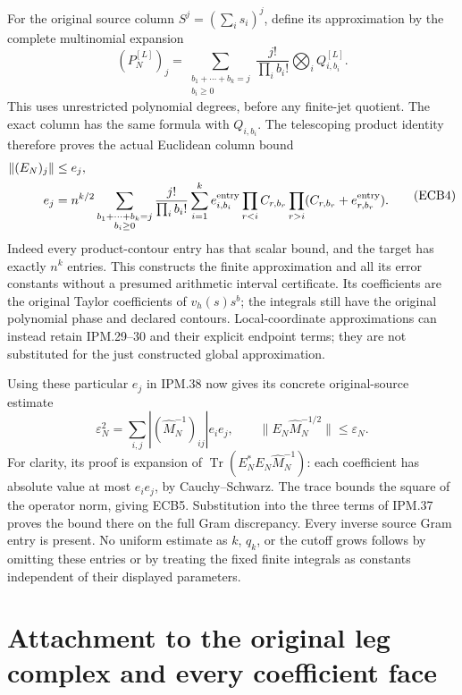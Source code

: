 \documentclass[11pt,a4paper]{article}
\theoremstyle{definition}
\begin{document}
For the original source column \(S^j=(\sum_i s_i)^j\), define its
approximation by the complete multinomial expansion
\[
 (P_N^{[L]})_j
 =\sum_{\substack{b_1+\cdots+b_k=j\\b_i\ge0}}
       \frac{j!}{\prod_i b_i!}
                   \bigotimes_i Q_{i,b_i}^{[L]} .
 \tag{ECB3}
\]
This uses unrestricted polynomial degrees, before any finite-jet
quotient. The exact column has the same formula with \(Q_{i,b_i}\).
The telescoping product identity therefore proves the actual
Euclidean column bound
\[
\begin{split}
 \|(E_N)_j\|&\le e_j,\\
 e_j&=n^{k/2}
 \sum_{\substack{b_1+\cdots+b_k=j\\b_i\ge0}}
 \frac{j!}{\prod_i b_i!}
 \sum_{i=1}^k e_{i,b_i}^{\rm entry}
       \prod_{r<i} C_{r,b_r}
       \prod_{r>i}(C_{r,b_r}+e_{r,b_r}^{\rm entry}) .
\end{split}\tag{ECB4}
\]
Indeed every product-contour entry has that scalar bound, and the
target has exactly \(n^k\) entries. This constructs the finite
approximation and all its error constants without a presumed
arithmetic interval certificate. Its coefficients are the original
Taylor coefficients of \(v_h(s)s^b\); the integrals still have the
original polynomial phase and declared contours.
Local-coordinate approximations can instead retain IPM.29--30
and their explicit endpoint terms; they are not substituted for the
just constructed global approximation.

Using these particular \(e_j\) in IPM.38 now gives its concrete
original-source estimate
\[
 \varepsilon_N^2
 =\sum_{i,j}|(\widehat M_N^{-1})_{ij}|e_i e_j,\qquad
 \|E_N\widehat M_N^{-1/2}\|\le\varepsilon_N .
 \tag{ECB5}
\]
For clarity, its proof is expansion of
\(\operatorname{Tr}(E_N^*E_N\widehat M_N^{-1})\):
each coefficient has absolute value at most \(e_i e_j\), by
Cauchy--Schwarz. The trace bounds the square of the operator norm,
giving ECB5. Substitution into the three terms of IPM.37 proves
the bound there on the full Gram discrepancy.
Every inverse source Gram entry is present. No uniform estimate
as \(k\), \(q_k\), or the cutoff grows follows by omitting these
entries or by treating the fixed finite integrals as constants
independent of their displayed parameters.



\section{Attachment to the original leg complex and every coefficient face}
\label{sec:intake-mixed-attachment}
\end{document}
